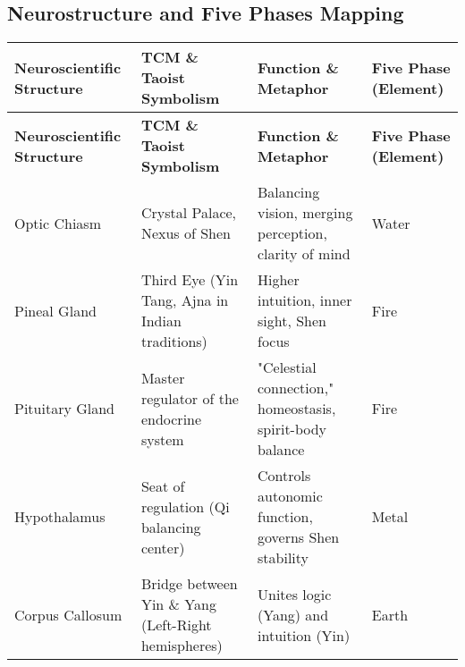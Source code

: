 \documentclass{article}
\begin{document}
\begin{landscape}

\section*{Neurostructure and Five Phases Mapping}

\renewcommand{\arraystretch}{1.3}

\begin{longtable}{|p{3.5cm}|p{4.5cm}|p{5.5cm}|p{3.5cm}|}
\hline
\textbf{Neuroscientific Structure} & 
\textbf{TCM \& Taoist Symbolism} & 
\textbf{Function \& Metaphor} & 
\textbf{Five Phase (Element)} \\
\hline
\endfirsthead

\hline
\textbf{Neuroscientific Structure} & 
\textbf{TCM \& Taoist Symbolism} & 
\textbf{Function \& Metaphor} & 
\textbf{Five Phase (Element)} \\
\hline
\endhead

Optic Chiasm & Crystal Palace, Nexus of Shen & Balancing vision, merging perception, clarity of mind & Water \\
\hline
Pineal Gland & Third Eye (Yin Tang, Ajna in Indian traditions) & Higher intuition, inner sight, Shen focus & Fire \\
\hline
Pituitary Gland & Master regulator of the endocrine system & "Celestial connection," homeostasis, spirit-body balance & Fire \\
\hline
Hypothalamus & Seat of regulation (Qi balancing center) & Controls autonomic function, governs Shen stability & Metal \\
\hline
Corpus Callosum & Bridge between Yin \& Yang (Left-Right hemispheres) & Unites logic (Yang) and intuition (Yin) & Earth \\
\hline
\end{longtable}

\end{landscape}
\end{document}
